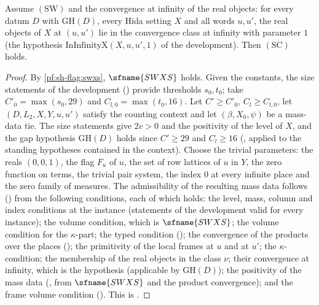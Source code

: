 \begin{proposition}\label{pf:sh-flag:stepchoice}
Assume $(\mathrm{SW})$ and the convergence at infinity of the real objects: for every datum $D$ with
$\mathrm{GH}(D)$, every Hida setting $X$ and all words $u,u'$, the real objects of $X$ at $(u,u')$ lie in
the convergence class at infinity with parameter $1$ (the hypothesis $\mathrm{InInfinityX}(X,u,u',1)$ of the
development). Then $(\mathrm{SC})$ holds.
\end{proposition}

\begin{proof}
By \cref{pf:sh-flag:swxs}, $\sfname{SWXS}$ holds. Given the constants, the size statements of the development
() provide thresholds $s_0,t_0$; take
$C'_0=\max(s_0,29)$ and $C_{l,0}=\max(t_0,16)$. Let $C'\ge C'_0$, $C_l\ge C_{l,0}$, let $(D,L_2,X,Y,u,u')$ satisfy
the counting context and let $(\beta,X_0,\psi)$ be a mass-data tie. The size statements give $2v>0$ and the
positivity of the level of $X$, and the gap hypothesis $\mathrm{GH}(D)$ holds since $C'\ge29$ and $C_l\ge16$
(, applied to the standing hypotheses contained in
the context). Choose the trivial parameters: the reals
$(0,0,1)$, the flag $F_u$ of $u$, the set of row lattices of $u$ in $Y$, the zero function on terms, the trivial
pair system, the index $0$ at every infinite place and the zero family of measures. The admissibility of the
resulting mass data follows () from the
following conditions, each of which holds: the level, mass,
column and index conditions at the instance (statements of the development valid for every instance); the volume
condition, which is $\sfname{SWXS}$; the volume condition for the $\kappa$-part; the typed condition
(); the convergence of the products over the places
(); the primitivity of the local frames at $u$ and at
$u'$; the $\kappa$-condition; the membership of the real objects in the class $\nu$; their convergence at infinity,
which is the hypothesis (applicable by $\mathrm{GH}(D)$); the positivity of the mass data
(, from $\sfname{SWXS}$ and the product convergence); and the frame
volume condition (). This is
.
\end{proof}

